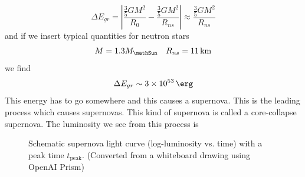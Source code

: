 \begin{equation}
    \Delta E_{gr} = \left\lvert\frac{\frac{3}{5}GM^2}{R_0}-\frac{\frac{3}{5}GM^2}{R_{ns}}\right\rvert \approx \frac{\frac{3}{5}GM^2}{R_{ns}}
\end{equation}
and if we insert typical quantities for neutron stars
\begin{align}
    M=1.3M_\mathSun && R_{ns} = \qty{11}{\kilo\meter}
\end{align}
we find
\begin{equation}
    \Delta E_{gr} \sim \qty{3e53}{\erg}
\end{equation}
This energy has to go somewhere and this causes a supernova. This is the leading process which causes supernovas. This kind of supernova is called a core-collapse supernova. The luminosity we see from this process is

\begin{figure}[!htb]
    \centering
    \caption{Schematic supernova light curve (log-luminosity vs. time) with a peak time $t_{\mathrm{peak}}$. (Converted from a whiteboard drawing using OpenAI Prism)}
\end{figure}

